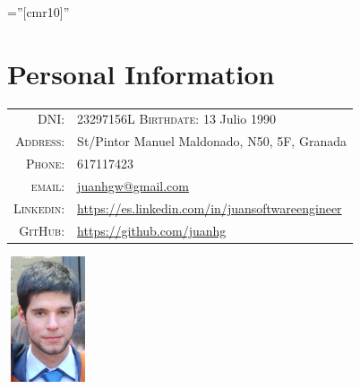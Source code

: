 \documentclass[a4paper,10pt]{article} %
\begin{document}
\pagestyle{empty} %

\font\fb=''[cmr10]'' %


\par{\bigskip\par} %

\section{Personal Information}

\noindent\begin{minipage}{0.3\textwidth}%
\begin{tabular}{rl}
\textsc{DNI:} & 23297156L \textsc{Birthdate:}  13 Julio 1990 \\
\textsc{Address:} & St/Pintor Manuel Maldonado, N50, 5F, Granada \\
\textsc{Phone:} & 617117423\\
\textsc{email:} & \href{mailto:juanhgw@gmail.com}{juanhgw@gmail.com} \\
\textsc{Linkedin:} & \url{https://es.linkedin.com/in/juansoftwareengineer} \\
\textsc{GitHub:} & \url{https://github.com/juanhg}
\end{tabular}
\end{minipage}%
\hfill%
\begin{minipage}{0.6\textwidth}\raggedleft
\includegraphics[width=24mm, height=37mm]{pictures/photo2}
\end{minipage}

\end{document}
